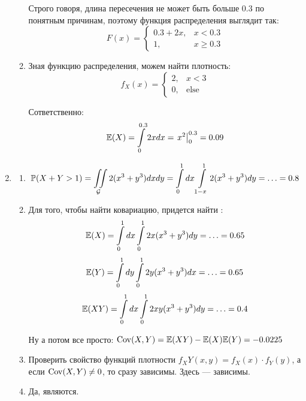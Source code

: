 \documentclass[12pt, a4paper]{article}\usepackage[]{graphicx}\usepackage[]{color}
\begin{document}
\begin{enumerate}
\begin{enumerate}
Строго говоря, длина пересечения не может быть больше 0.3 по понятным причинам, поэтому функция распределения выглядит так:
\[
F(x) = \begin{cases}
0.3+2x, & x < 0.3\\
1, & x \geqslant 0.3
\end{cases}
\]

\item Зная функцию распределения, можем найти плотность:
\[f_X(x) = \begin{cases}
2, & x < 3\\
0, & \text{else}
\end{cases}\]

Сответственно:
\[
\E(X) = \int \limits_{0}^{0.3} 2x dx = \left.  x^2 \right|_{0}^{0.3} = 0.09
\]
\end{enumerate}



\item

\begin{enumerate}
\item \[\P(X+Y > 1) = \iint \limits_{\mathcal{G}}2(x^3+y^3)dxdy = \int \limits_{0}^{1} dx \int \limits_{1-x}^{1}2(x^3+y^3)dy = \ldots  = 0.8\]
\item Для того, чтобы найти ковариацию, придется найти :
\[\E(X) = \int\limits_{0}^{1} dx \int\limits _{0}^{1}2x(x^3+y^3)dy = \ldots = 0.65\]
\[\E(Y) = \int\limits_{0}^{1} dy \int\limits_{0}^{1}2y(x^3+y^3)dx = \ldots = 0.65 \]
\[\E(XY) = \int\limits_{0}^{1}dx\int\limits_{0}^{1}2xy(x^3+y^3)dy = \ldots = 0.4\]

Ну а потом все просто: $\Cov(X, Y) = \E(XY) - \E(X)\E(Y) = -0.0225$

\item Проверить свойство функций плотности $f_XY(x, y) = f_X(x)\cdot f_Y(y)$, а если $\Cov(X, Y) \ne 0$, то сразу зависимы. Здесь — зависимы.
\item Да, являются.
\end{enumerate}



\end{enumerate}
\end{document}
